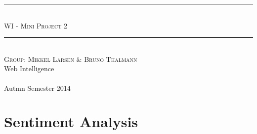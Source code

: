 


\begin{titlepage}
\newcommand{\HRule}{\rule{\linewidth}{0.5mm}}

\begin{center}

\HRule \\[0.5cm]
\textsc{ \Huge WI - Mini Project 2}\\

\HRule \\[3cm]

\textsc{\Large Group: Mikkel Larsen \& Bruno Thalmann} \\[1cm]


\vfill
{\Large Web Intelligence}
\\ ~\\
{\large Autmn Semester 2014}

\end{center}
\end{titlepage}



%


\setcounter{tocdepth}{1}
\tableofcontents

\clearpage



\clearpage


\chapter{Sentiment Analysis}


%



\label{LastPage}

